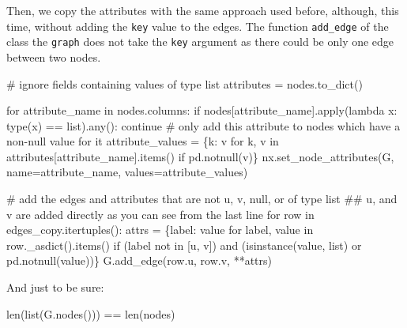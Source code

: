 \documentclass[
  letterpaper,
  DIV=11,
  numbers=noendperiod]{scrreprt}
\newenvironment{Shaded}{\begin{snugshade}}{\end{snugshade}}
\newcommand{\BuiltInTok}[1]{\textcolor[rgb]{0.00,0.23,0.31}{#1}}
\newcommand{\CommentTok}[1]{\textcolor[rgb]{0.37,0.37,0.37}{#1}}
\newcommand{\ControlFlowTok}[1]{\textcolor[rgb]{0.00,0.23,0.31}{#1}}
\newcommand{\KeywordTok}[1]{\textcolor[rgb]{0.00,0.23,0.31}{#1}}
\newcommand{\NormalTok}[1]{\textcolor[rgb]{0.00,0.23,0.31}{#1}}
\newcommand{\OperatorTok}[1]{\textcolor[rgb]{0.37,0.37,0.37}{#1}}
\newcommand{\StringTok}[1]{\textcolor[rgb]{0.13,0.47,0.30}{#1}}
\begin{document}
Then, we copy the attributes with the same approach used before,
although, this time, without adding the \texttt{key} value to the edges.
The function \texttt{add\_edge} of the class the \texttt{graph} does not
take the \texttt{key} argument as there could be only one edge between
two nodes.

\begin{Shaded}
\begin{Highlighting}[]
\CommentTok{\# ignore fields containing values of type list}
\NormalTok{attributes }\OperatorTok{=}\NormalTok{ nodes.to\_dict()}

\ControlFlowTok{for}\NormalTok{ attribute\_name }\KeywordTok{in}\NormalTok{ nodes.columns:}
    \ControlFlowTok{if}\NormalTok{ nodes[attribute\_name].}\BuiltInTok{apply}\NormalTok{(}\KeywordTok{lambda}\NormalTok{ x: }\BuiltInTok{type}\NormalTok{(x) }\OperatorTok{==} \BuiltInTok{list}\NormalTok{).}\BuiltInTok{any}\NormalTok{(): }
        \ControlFlowTok{continue}    
    \CommentTok{\# only add this attribute to nodes which have a non{-}null value for it}
\NormalTok{    attribute\_values }\OperatorTok{=}\NormalTok{ \{k: v }\ControlFlowTok{for}\NormalTok{ k, v }\KeywordTok{in}\NormalTok{ attributes[attribute\_name].items() }\ControlFlowTok{if}\NormalTok{ pd.notnull(v)\}}
\NormalTok{    nx.set\_node\_attributes(G, name}\OperatorTok{=}\NormalTok{attribute\_name, values}\OperatorTok{=}\NormalTok{attribute\_values)}

\CommentTok{\# add the edges and attributes that are not u, v, null, or of type list}
\CommentTok{\#\# u, and v are added directly as you can see from the last line}
\ControlFlowTok{for}\NormalTok{ row }\KeywordTok{in}\NormalTok{ edges\_copy.itertuples():}
\NormalTok{    attrs }\OperatorTok{=}\NormalTok{ \{label: value }\ControlFlowTok{for}\NormalTok{ label, value }\KeywordTok{in}\NormalTok{ row.\_asdict().items() }\ControlFlowTok{if}\NormalTok{ (label }\KeywordTok{not} \KeywordTok{in}\NormalTok{ [}\StringTok{\textquotesingle{}u\textquotesingle{}}\NormalTok{, }\StringTok{\textquotesingle{}v\textquotesingle{}}\NormalTok{]) }\KeywordTok{and}\NormalTok{ (}\BuiltInTok{isinstance}\NormalTok{(value, }\BuiltInTok{list}\NormalTok{) }\KeywordTok{or}\NormalTok{ pd.notnull(value))\}}
\NormalTok{    G.add\_edge(row.u, row.v, }\OperatorTok{**}\NormalTok{attrs)}
\end{Highlighting}
\end{Shaded}

And just to be sure:

\begin{Shaded}
\begin{Highlighting}[]
\BuiltInTok{len}\NormalTok{(}\BuiltInTok{list}\NormalTok{(G.nodes())) }\OperatorTok{==} \BuiltInTok{len}\NormalTok{(nodes)}
\end{Highlighting}
\end{Shaded}
\end{document}
